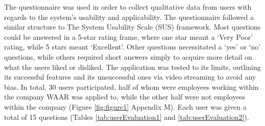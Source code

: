 \documentclass{aifyp}
\begin{document}
\indent The questionnaire was used in order to collect qualitative data from users with regards to the system's usability and applicability. The questionnaire followed a similar structure to The System Usability Scale (SUS) framework. Most questions could be answered in a 5-star rating frame, where one star meant a `Very Poor' rating, while 5 stars meant `Excellent'. Other questions necessitated a `yes' or `no' questions, while others required short answers simply to acquire more detail on what the users liked or disliked. The application was tested to its limits, outlining its successful features and its unsuccessful ones via video streaming to avoid any bias. In total, 30 users participated, half of whom were employees working within the company WAAR was applied to, while the other half were not employees within the company (Figure \ref{fig:figure1} Appendix M). Each user was given a total of 15 questions (Tables \ref{tab:userEvaluation1} and \ref{tab:userEvaluation2}).
\end{document}
